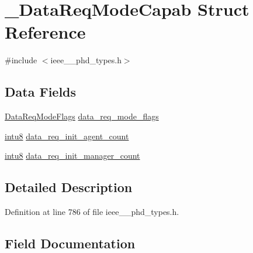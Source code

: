 \hypertarget{struct___data_req_mode_capab}{}\section{\+\_\+\+Data\+Req\+Mode\+Capab Struct Reference}
\label{struct___data_req_mode_capab}


{\ttfamily \#include $<$ieee\+\_\+\_\+phd\+\_\+types.\+h$>$}

\subsection*{Data Fields}
\begin{DoxyCompactItemize}
\item 
\hyperlink{ieee__11073__phd__types_8h_ad7a4feb0f9f73e362ab9a2a927cda5bd}{Data\+Req\+Mode\+Flags} \hyperlink{struct___data_req_mode_capab_a4445518892da33a4403dd8657772e34b}{data\+\_\+req\+\_\+mode\+\_\+flags}
\item 
\hyperlink{ieee__11073__phd__types_8h_ae21d5428a584a153613cbe335630d3f4}{intu8} \hyperlink{struct___data_req_mode_capab_aace4970b609e6b37f685ca441d4f56b1}{data\+\_\+req\+\_\+init\+\_\+agent\+\_\+count}
\item 
\hyperlink{ieee__11073__phd__types_8h_ae21d5428a584a153613cbe335630d3f4}{intu8} \hyperlink{struct___data_req_mode_capab_adbd90de31af60ffaaf16f8bd6f6b8cd9}{data\+\_\+req\+\_\+init\+\_\+manager\+\_\+count}
\end{DoxyCompactItemize}


\subsection{Detailed Description}


Definition at line 786 of file ieee\+\_\+\_\+phd\+\_\+types.\+h.



\subsection{Field Documentation}
\hypertarget{struct___data_req_mode_capab_aace4970b609e6b37f685ca441d4f56b1}{}
